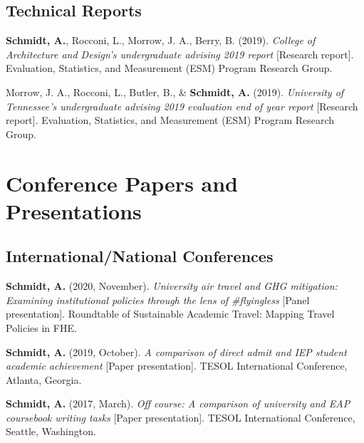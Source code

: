 \documentclass[10pt,a4paper,]{article}
\begin{document}
\endgroup

\hypertarget{technical-reports}{%
\subsection{Technical Reports}\label{technical-reports}}

\begingroup
\setlength{\parindent}{-0.5in}
\setlength{\leftskip}{0.5in}

\textbf{Schmidt, A.}, Rocconi, L., Morrow, J. A., Berry, B. (2019). \emph{College of Architecture and Design's undergraduate advising 2019 report} {[}Research report{]}. Evaluation, Statistics, and Measurement (ESM) Program Research Group.

Morrow, J. A., Rocconi, L., Butler, B., \& \textbf{Schmidt, A.} (2019). \emph{University of Tennessee's undergraduate advising 2019 evaluation end of year report} {[}Research report{]}. Evaluation, Statistics, and Measurement (ESM) Program Research Group.

\endgroup

\hypertarget{conference-papers-and-presentations}{%
\section{Conference Papers and Presentations}\label{conference-papers-and-presentations}}

\hypertarget{internationalnational-conferences}{%
\subsection{International/National Conferences}\label{internationalnational-conferences}}

\begingroup
\setlength{\parindent}{-0.5in}
\setlength{\leftskip}{0.5in}

\textbf{Schmidt, A.} (2020, November). \emph{University air travel and GHG mitigation: Examining institutional policies through the lens of \#flyingless} {[}Panel presentation{]}. Roundtable of Sustainable Academic Travel: Mapping Travel Policies in FHE.

\textbf{Schmidt, A.} (2019, October). \emph{A comparison of direct admit and IEP student academic achievement} {[}Paper presentation{]}. TESOL International Conference, Atlanta, Georgia.

\textbf{Schmidt, A.} (2017, March). \emph{Off course: A comparison of university and EAP coursebook writing tasks} {[}Paper presentation{]}. TESOL International Conference, Seattle, Washington.
\end{document}

